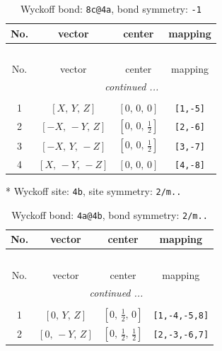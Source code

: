 \documentclass[fleqn,8pt]{jsarticle}
\begin{document}
\renewcommand{\arraystretch}{1.2}
\begin{longtable}{cccc}
\caption{Wyckoff bond: {\tt 8c@4a}, bond symmetry: {\tt -1}}
 \\
 \hline \hline
No. & vector & center & mapping \\ \hline \endfirsthead

\multicolumn{3}{l}{\tablename\ \thetable{}} \\
 \hline \hline
No. & vector & center & mapping \\ \hline \endhead

 \hline \hline
\multicolumn{3}{r}{\footnotesize\it continued ...} \\ \endfoot

 \hline \hline
\multicolumn{3}{r}{} \\ \endlastfoot

1 & $\left[ X,\, Y,\, Z \right]$ & $\left[ 0,\, 0,\, 0 \right]$ & {\tt [1,-5]} \\ \hline
2 & $\left[ - X,\, - Y,\, Z \right]$ & $\left[ 0,\, 0,\, \frac{1}{2} \right]$ & {\tt [2,-6]} \\ \hline
3 & $\left[ - X,\, Y,\, - Z \right]$ & $\left[ 0,\, 0,\, \frac{1}{2} \right]$ & {\tt [3,-7]} \\ \hline
4 & $\left[ X,\, - Y,\, - Z \right]$ & $\left[ 0,\, 0,\, 0 \right]$ & {\tt [4,-8]} \\
\end{longtable}
* Wyckoff site: {\tt 4b}, site symmetry: {\tt 2/m..}
\renewcommand{\arraystretch}{1.2}
\begin{longtable}{cccc}
\caption{Wyckoff bond: {\tt 4a@4b}, bond symmetry: {\tt 2/m..}}
 \\
 \hline \hline
No. & vector & center & mapping \\ \hline \endfirsthead

\multicolumn{3}{l}{\tablename\ \thetable{}} \\
 \hline \hline
No. & vector & center & mapping \\ \hline \endhead

 \hline \hline
\multicolumn{3}{r}{\footnotesize\it continued ...} \\ \endfoot

 \hline \hline
\multicolumn{3}{r}{} \\ \endlastfoot

1 & $\left[ 0,\, Y,\, Z \right]$ & $\left[ 0,\, \frac{1}{2},\, 0 \right]$ & {\tt [1,-4,-5,8]} \\ \hline
2 & $\left[ 0,\, - Y,\, Z \right]$ & $\left[ 0,\, \frac{1}{2},\, \frac{1}{2} \right]$ & {\tt [2,-3,-6,7]} \\
\end{longtable}
\end{document}
